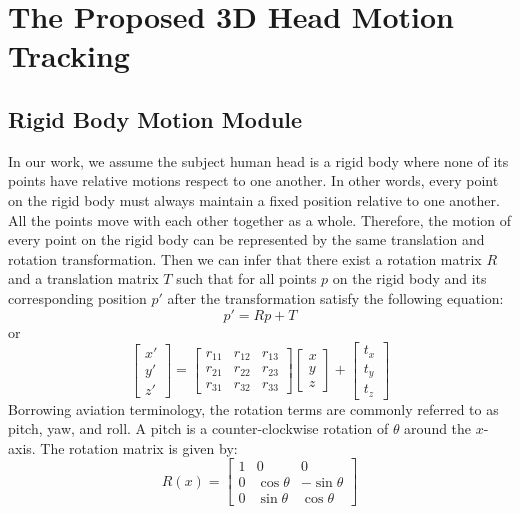 \chapter{The Proposed 3D Head Motion Tracking}
\label{c:method}

\section{Rigid Body Motion Module}
In our work, we assume the subject human head is a rigid body where none of its points have relative motions respect to one another. In other words, every point on the rigid body must always maintain a fixed position relative to one another. All the points move with each other together as a whole. Therefore, the motion of every point on the rigid body can be represented by the same translation and rotation transformation. Then we can infer that there exist a rotation matrix $R$ and a translation matrix $T$ such that for all points $p$ on the rigid body and its corresponding position $p'$ after the transformation satisfy the following equation:
\begin{equation}
p' = Rp + T
\label{e:rbt}
\end{equation}
or
\begin{equation}
\begin{bmatrix}
x'\\y'\\z'
\end{bmatrix}
=
\begin{bmatrix}
r_{11}&r_{12}&r_{13}\\
r_{21}&r_{22}&r_{23}\\
r_{31}&r_{32}&r_{33}
\end{bmatrix}
\begin{bmatrix}
x\\y\\z
\end{bmatrix}
+
\begin{bmatrix}
t_{x}\\t_{y}\\t_{z}
\end{bmatrix}
\end{equation}
Borrowing aviation terminology, the rotation terms are commonly referred to as pitch, yaw, and roll. A pitch is a counter-clockwise rotation of $\theta$ around the $x$-axis. The rotation matrix is given by:
\begin{equation}
R(x)=
\begin{bmatrix}
1&0&0\\
0&\cos\theta & -\sin\theta \\
0&\sin\theta & \cos\theta
\end{bmatrix}
\end{equation}
